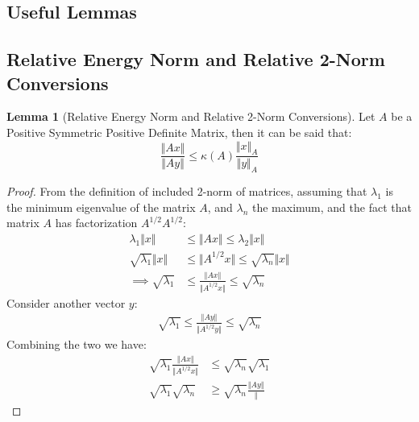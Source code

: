 \documentclass[]{article}
\theoremstyle{definition}
\newtheorem{lemma}{Lemma}[subsection]    %
\begin{document}
\begin{appendices}
    
    \section{Useful Lemmas}
        \subsection{Relative Energy Norm and Relative 2-Norm Conversions}
        \begin{lemma}[Relative Energy Norm and Relative 2-Norm Conversions]\label{lemma:Relative_Energy_Norm_and_Relative_2_Norm_Conversions}
            Let $A$ be a Positive Symmetric Positive Definite Matrix, then it can be said that: 
            $$
            \frac{\Vert A x\Vert}{\Vert Ay \Vert} \le \kappa(A)\frac{\Vert 
            x\Vert_A}{\Vert y \Vert_A}
            $$
        \end{lemma}
        \begin{proof}
            From the definition of included 2-norm of matrices, assuming that $\lambda_1$ is the minimum eigenvalue of the matrix $A$, and $\lambda_n$ the maximum, and the fact that matrix $A$ has factorization $A^{1/2}A^{1/2}$: 
            \begin{align}
                \lambda_1 \Vert x \Vert 
                &\le \Vert Ax\Vert 
                \le \lambda_2 \Vert x\Vert
                \\
                \sqrt{\lambda_1} \Vert x\Vert 
                & \le \Vert A^{1/2}x\Vert \le \sqrt{\lambda_n}\Vert x \Vert
                \\
                \implies
                \sqrt{\lambda_1} & \le \frac{\Vert Ax\Vert}{\Vert A^{1/2}x \Vert} 
                \le \sqrt{\lambda_n}
            \end{align}
            Consider another vector $y$: 
            \begin{align}
                \sqrt{\lambda_1} \le \frac{\Vert Ay\Vert}{\Vert A^{1/2}y \Vert} \le \sqrt{\lambda_n}
            \end{align}
            Combining the two we have: 
            \begin{align}
                \sqrt{\lambda_1}\frac{\Vert Ax\Vert}{\Vert A^{1/2}x \Vert} 
                & \le \sqrt{\lambda_n}\sqrt{\lambda_1}
                \\
                \sqrt{\lambda_1}\sqrt{\lambda_n}& \ge \sqrt{\lambda_n} \frac{\Vert Ay\Vert}{\left\Vert
}
\end{align}
\end{proof}
\end{appendices}
\end{document}
